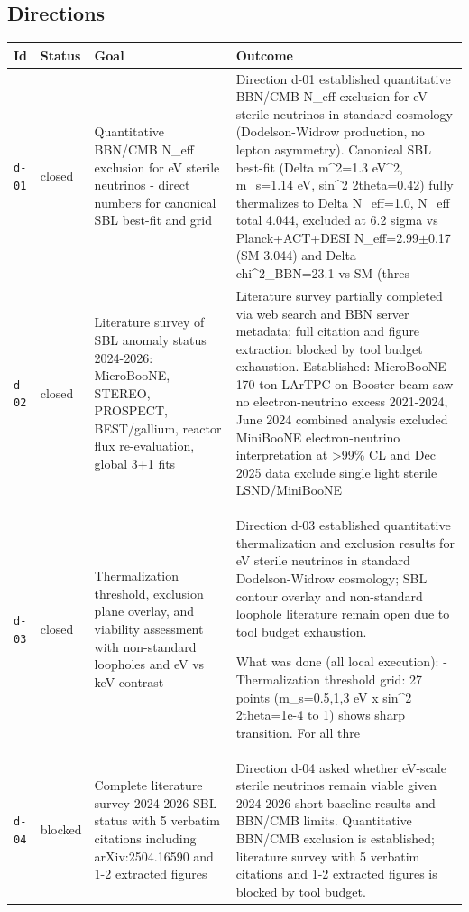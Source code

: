 \documentclass[11pt,a4paper]{article}
\begin{document}
\subsection{Directions}
\begin{longtable}{@{}p{}p{}p{}p{}@{}}
\toprule Id & Status & Goal & Outcome \\ \midrule \endhead
\texttt{d-01} & closed & Quantitative BBN/CMB N\_eff exclusion for eV sterile neutrinos - direct numbers for canonical SBL best-fit and grid & Direction d-01 established quantitative BBN/CMB N\_eff exclusion for eV sterile neutrinos in standard cosmology (Dodelson-Widrow production, no lepton asymmetry). Canonical SBL best-fit (Delta m\textasciicircum{}2=1.3 eV\textasciicircum{}2, m\_s=1.14 eV, sin\textasciicircum{}2 2theta=0.42) fully thermalizes to Delta N\_eff=1.0, N\_eff total 4.044, excluded at 6.2 sigma vs Planck+ACT+DESI N\_eff=2.99$\pm$0.17 (SM 3.044) and Delta chi\textasciicircum{}2\_BBN=23.1 vs SM (thres \\
\texttt{d-02} & closed & Literature survey of SBL anomaly status 2024-2026: MicroBooNE, STEREO, PROSPECT, BEST/gallium, reactor flux re-evaluation, global 3+1 fits & Literature survey partially completed via web search and BBN server metadata; full citation and figure extraction blocked by tool budget exhaustion. Established: MicroBooNE 170-ton LArTPC on Booster beam saw no electron-neutrino excess 2021-2024, June 2024 combined analysis excluded MiniBooNE electron-neutrino interpretation at \textgreater{}99\% CL and Dec 2025 data exclude single light sterile LSND/MiniBooNE  \\
\texttt{d-03} & closed & Thermalization threshold, exclusion plane overlay, and viability assessment with non-standard loopholes and eV vs keV contrast & Direction d-03 established quantitative thermalization and exclusion results for eV sterile neutrinos in standard Dodelson-Widrow cosmology; SBL contour overlay and non-standard loophole literature remain open due to tool budget exhaustion.

What was done (all local execution):
- Thermalization threshold grid: 27 points (m\_s=0.5,1,3 eV x sin\textasciicircum{}2 2theta=1e-4 to 1) shows sharp transition. For all thre \\
\texttt{d-04} & blocked & Complete literature survey 2024-2026 SBL status with 5 verbatim citations including arXiv:2504.16590 and 1-2 extracted figures & Direction d-04 asked whether eV-scale sterile neutrinos remain viable given 2024-2026 short-baseline results and BBN/CMB limits. Quantitative BBN/CMB exclusion is established; literature survey with 5 verbatim citations and 1-2 extracted figures is blocked by tool budget.


\end{longtable}
\end{document}

